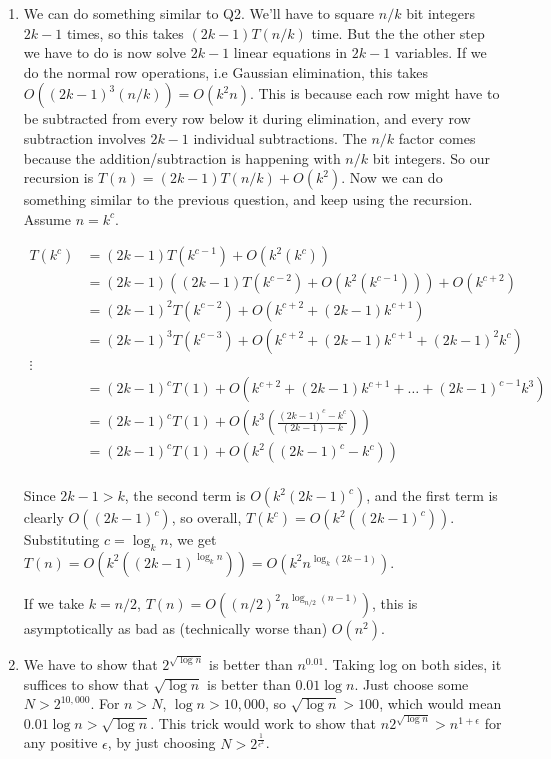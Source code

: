 \documentclass[12pt]{report}
\begin{document}
\begin{enumerate}[label=\textbf{\arabic*.}]
    \item We can do something similar to Q2. We'll have to square $n/k$ bit integers $2k-1$ times, so this takes $(2k - 1)T(n/k)$ time. But the 
    the other step we have to do is now solve $2k-1$ linear equations in $2k-1$ variables. If we do the normal row operations, i.e Gaussian
    elimination, this takes $O({(2k-1)}^3 (n/k)) = O(k^2 n)$. This is because each row might have to be subtracted from every row below it 
    during elimination, and every row subtraction involves $2k-1$ individual subtractions. 
    The $n/k$ factor comes because the addition/subtraction is happening with $n/k$ bit integers.
    So our recursion is 
    $T(n) = (2k-1)T(n/k) + O(k^2)$. Now we can do something similar to the previous question, and keep using the recursion. Assume $n = k^c$.

    \begin{align*}
        T(k^c) &= (2k-1)T(k^{c-1}) + O(k^2 (k^c)) \\
        &= (2k-1)((2k-1)T(k^{c-2}) + O(k^2 (k^{c-1}))) + O(k^{c+2}) \\
        &= {(2k-1)}^2 T(k^{c-2}) + O(k^{c+2} + (2k-1) k^{c+1}) \\
        &= {(2k-1)}^3 T(k^{c-3}) + O(k^{c+2} + (2k-1) k^{c+1} + {(2k-1)}^2 k^c) \\
        \vdots \\
        &= {(2k-1)}^c T(1) + O(k^{c+2} + (2k-1) k^{c+1} + \dots + {(2k-1)}^{c-1} k^3) \\
        &= {(2k-1)}^c T(1) + O\left(k^3 \left(\frac{{(2k-1)}^c - k^c}{(2k-1) - k}\right)\right) \\
        &= {(2k-1)}^c T(1) + O(k^2({(2k-1)}^c - k^c)) \\
    \end{align*}

    Since $2k-1 > k$, the second term is $O(k^2{(2k-1)}^c)$, and the first term is clearly $O({(2k-1)}^c)$, so overall, $T(k^c) = O(k^2 ({(2k-1)}^c))$.
    Substituting $c = \log_k n$, we get $T(n) = O(k^2 ({(2k-1)}^{\log_k n})) = O(k^2 n^{\log_k (2k-1)})$.

    If we take $k = n/2$, $T(n) = O({(n/2)}^2 n^{\log_{n/2} (n-1)})$, this is asymptotically as bad as (technically worse than) $O(n^2)$.

    \item We have to show that $2^{\sqrt{\log n}}$ is better than $n^{0.01}$. Taking log on both sides, it suffices to show that $\sqrt{\log n}$ is better
    than $0.01 \log n$. Just choose some $N > 2^{10,000}$. For $n > N$, $\log n > 10,000$, so $\sqrt{\log n} > 100$, which would mean $0.01 \log n >  
    \sqrt{\log n}$. This trick would work to show that $n 2^{\sqrt{\log n}} > n^{1 + \epsilon}$ for any positive $\epsilon$, by just choosing
    $N > 2^{\frac{1}{\epsilon^2}}$. 


\end{enumerate}
\end{document}
